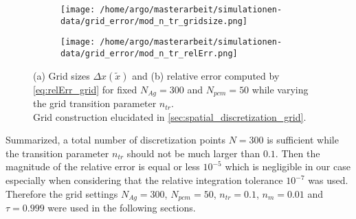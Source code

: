 \documentclass{scrartcl}[12pt, halfparskip]
\numberwithin{equation}{section}
\numberwithin{figure}{section}
\numberwithin{table}{section}
\begin{document}
\begin{figure}[H]
	\begin{subfigure}{0.49\textwidth}
		\texttt{[image: /home/argo/masterarbeit/simulationen-data/grid\_error/mod\_n\_tr\_gridsize.png]}
		\caption{}
		\label{fig:gridsize_mod_n_tr}
	\end{subfigure}
	\begin{subfigure}{0.49\textwidth}
		\texttt{[image: /home/argo/masterarbeit/simulationen-data/grid\_error/mod\_n\_tr\_relErr.png]}
		\caption{}
		\label{fig:grid_relErr_mod_n_tr}
	\end{subfigure}
	\caption{(a) Grid sizes $\Delta x(\tilde{x})$ and (b) relative error computed by \cref{eq:relErr_grid} for fixed $N_{Ag}=300$ and $N_{pcm}=50$ while varying the grid transition parameter $n_{tr}$. \\
	Grid construction elucidated in \cref{sec:spatial_discretization_grid}.}
	\label{fig:grid_mod_n_tr}
\end{figure}

Summarized, a total number of discretization points $N=300$ is sufficient while the transition parameter $n_{tr}$ should not be much larger than $0.1$. Then the magnitude of the relative error is equal or less $10^{-5}$ which is negligible in our case especially when considering that the relative integration tolerance $10^{-7}$ was used. 
Therefore the grid settings $N_{Ag}=300$, $N_{pcm}=50$, $n_{tr}=0.1$, $n_m=0.01$ and $\tau=0.999$ were used in the following sections.
\end{document}
